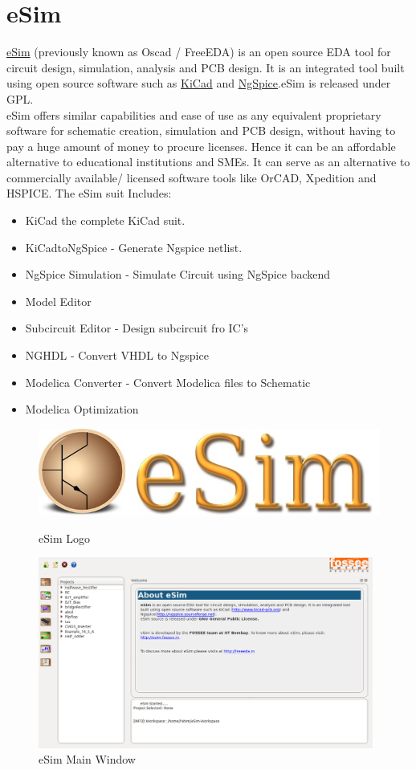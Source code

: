 \documentclass[12pt,a4paper]{report}
\begin{document}
\section{eSim}
\href{https://esim.fossee.in/}{eSim} (previously known as Oscad / FreeEDA) is an open source EDA tool for circuit design, simulation, analysis and PCB design. It is an integrated tool built using open source software such as \href{http://www.kicad-pcb.org}{KiCad} and \href{http://ngspice.sourceforge.net/}{NgSpice}.eSim is released under GPL.
\\
eSim offers similar capabilities and ease of use as any equivalent proprietary software for schematic creation, simulation and PCB design, without having to pay a huge amount of money to procure licenses. Hence it can be an affordable alternative to educational institutions and SMEs. It can serve as an alternative to commercially available/ licensed software tools like OrCAD, Xpedition and HSPICE.
The eSim suit Includes: 
\begin{itemize}
	\itemsep0em 
	\item KiCad  the complete KiCad suit.
	\item KiCadtoNgSpice - Generate Ngspice netlist.
	\item NgSpice Simulation - Simulate Circuit using NgSpice backend
	\item Model Editor
	\item Subcircuit Editor - Design subcircuit fro IC's 
	\item NGHDL - Convert VHDL to Ngspice
	\item Modelica Converter - Convert Modelica files to Schematic
	\item Modelica Optimization
\end{itemize}

\begin{figure}[h]
	\centering
	\includegraphics[scale=0.2]{eSim-logo}
	\caption{eSim Logo}
	\vspace{5mm}
	\includegraphics[width=11cm]{eSim}
	\caption{eSim Main Window}
\end{figure}
\end{document}
